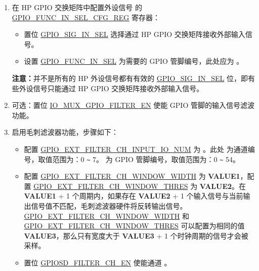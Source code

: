\documentclass[main\_\_CN.tex]{subfiles}
\begin{document}
\begin{enumerate}
    \item 在 HP GPIO 交换矩阵中配置外设信号   的 \hyperref[regdesc:GPIOFUNCNINSELCFGREG]{GPIO\_FUNC\_IN\_SEL\_CFG\_REG} 寄存器：
    \begin{itemize}
        \item 置位 \hyperref[fielddesc:GPIOSIGNINSEL]{GPIO\_SIG\_IN\_SEL} 选择通过 HP GPIO 交换矩阵接收外部输入信号。
        \item 设置 \hyperref[fielddesc:GPIOFUNCNINSEL]{GPIO\_FUNC\_IN\_SEL} 为需要的 GPIO 管脚编号，此处应为 。
    \end{itemize}
    {\bfseries 注意：}并不是所有的 HP 外设信号都有有效的 \hyperref[fielddesc:GPIOSIGNINSEL]{GPIO\_SIG\_IN\_SEL} 位，即有些外设信号只能通过 HP GPIO 交换矩阵接收外部输入信号。
    \item \label{step:2} 可选：置位 \hyperref[fielddesc:IOMUXGPIONFILTEREN]{IO\_MUX\_GPIO\_FILTER\_EN} 使能 GPIO 管脚的输入信号滤波功能。
\item \label{step:3} 启用毛刺滤波器功能，步骤如下：
\begin{itemize}
    \item 配置  \hyperref[fielddesc:GPIOSDFILTERCH0INPUTIONUM]{GPIO\_EXT\_FILTER\_CH\_INPUT\_IO\_NUM} 为 。此处  为通道编号，取值范围为：0 \verb+~+ 7。 为 GPIO 管脚编号，取值范围为：0 \verb+~+ 54。
    \item 配置  \hyperref[fielddesc:GPIOSDFILTERCH0WINDOWWIDTH]{GPIO\_EXT\_FILTER\_CH\_WINDOW\_WIDTH} 为 \textbf{VALUE1}，配置 \hyperref[fielddesc:GPIOSDFILTERCH0WINDOWTHRES]{GPIO\_EXT\_FILTER\_CH\_WINDOW\_THRES} 为 \textbf{VALUE2}。在 \textbf{VALUE1} + 1 个周期内，如果存在 \textbf{VALUE2} + 1 个输入信号与当前输出信号值不匹配，毛刺滤波器硬件将反转输出信号。\hyperref[fielddesc:GPIOSDFILTERCH0WINDOWWIDTH]{GPIO\_EXT\_FILTER\_CH\_WINDOW\_WIDTH} 和 \hyperref[fielddesc:GPIOSDFILTERCH0WINDOWTHRES]{GPIO\_EXT\_FILTER\_CH\_WINDOW\_THRES} 可以配置为相同的值 \textbf{VALUE3}，那么只有宽度大于 \textbf{VALUE3} + 1 个时钟周期的信号才会被采样。
    \item 置位 \hyperref[fielddesc:GPIOSDFILTERCH0EN]{GPIOSD\_FILTER\_CH\_EN} 使能通道 。
\end{itemize}


\end{enumerate}
\end{document}
